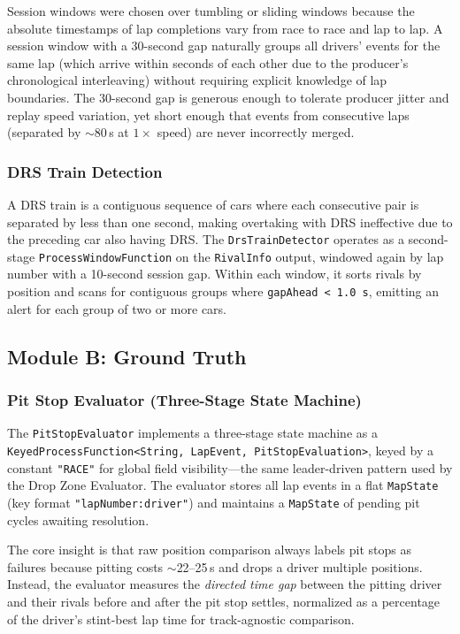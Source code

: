 \documentclass[a4paper,twocolumn]{article}
\begin{document}
Session windows were chosen over tumbling or sliding windows because the
absolute timestamps of lap completions vary from race to race and lap to
lap. A session window with a 30-second gap naturally groups all drivers'
events for the same lap (which arrive within seconds of each other due to
the producer's chronological interleaving) without requiring explicit
knowledge of lap boundaries. The 30-second gap is generous enough to
tolerate producer jitter and replay speed variation, yet short enough that
events from consecutive laps (separated by $\sim$80\,s at $1\times$
speed) are never incorrectly merged.

\subsubsection{DRS Train Detection}

A DRS train is a contiguous sequence of cars where each consecutive pair
is separated by less than one second, making overtaking with DRS
ineffective due to the preceding car also having DRS. The
\texttt{DrsTrainDetector} operates as a second-stage
\texttt{ProcessWindowFunction} on the \texttt{RivalInfo} output, windowed
again by lap number with a 10-second session gap. Within each window, it
sorts rivals by position and scans for contiguous groups where
\texttt{gapAhead < 1.0\,s}, emitting an alert for each group of two or
more cars.

\subsection{Module B: Ground Truth}

\subsubsection{Pit Stop Evaluator (Three-Stage State Machine)}

The \texttt{PitStopEvaluator} implements a three-stage state machine as a
\texttt{KeyedProcessFunction<String, LapEvent, PitStopEvaluation>}, keyed
by a constant \texttt{"RACE"} for global field visibility---the same
leader-driven pattern used by the Drop Zone Evaluator. The evaluator
stores all lap events in a flat \texttt{MapState} (key format
\texttt{"lapNumber:driver"}) and maintains a \texttt{MapState} of
pending pit cycles awaiting resolution.

The core insight is that raw position comparison always labels pit stops
as failures because pitting costs $\sim$22--25\,s and drops a driver
multiple positions. Instead, the evaluator measures the \emph{directed
time gap} between the pitting driver and their rivals before and after
the pit stop settles, normalized as a percentage of the driver's
stint-best lap time for track-agnostic comparison.
\end{document}
